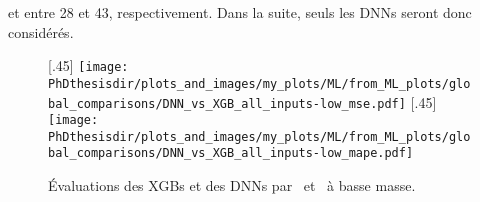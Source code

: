 et
entre \num{28} et \num{43},
respectivement.
Dans la suite, seuls les DNNs seront donc considérés.
\begin{figure}[h]
\centering

[.45\textwidth]
{\texttt{[image: \\PhDthesisdir/plots\_and\_images/my\_plots/ML/from\_ML\_plots/global\_comparisons/DNN\_vs\_XGB\_all\_inputs-low\_mse.pdf]}\vspace{-\baselineskip}}
\hfill
{}[.45\textwidth]
{\texttt{[image: \\PhDthesisdir/plots\_and\_images/my\_plots/ML/from\_ML\_plots/global\_comparisons/DNN\_vs\_XGB\_all\_inputs-low\_mape.pdf]}\vspace{-\baselineskip}}

\caption{Évaluations des XGBs et des DNNs par \LossMSE\ et \LossMAPE\ à basse masse.}
\label{fig-DNN_vs_XGB-mse_mape-low}
\end{figure}
